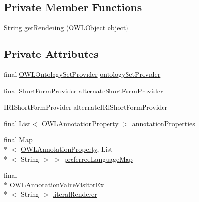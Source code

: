 \subsection*{Private Member Functions}
\begin{DoxyCompactItemize}
\item 
String \hyperlink{classorg_1_1semanticweb_1_1owlapi_1_1util_1_1_annotation_value_short_form_provider_a25ed18bddd30d661c369fbfbe7159e04}{get\-Rendering} (\hyperlink{interfaceorg_1_1semanticweb_1_1owlapi_1_1model_1_1_o_w_l_object}{O\-W\-L\-Object} object)
\end{DoxyCompactItemize}
\subsection*{Private Attributes}
\begin{DoxyCompactItemize}
\item 
final \hyperlink{interfaceorg_1_1semanticweb_1_1owlapi_1_1model_1_1_o_w_l_ontology_set_provider}{O\-W\-L\-Ontology\-Set\-Provider} \hyperlink{classorg_1_1semanticweb_1_1owlapi_1_1util_1_1_annotation_value_short_form_provider_a4d4ec7b3e951eefa476162fbc4c1f7f4}{ontology\-Set\-Provider}
\item 
final \hyperlink{interfaceorg_1_1semanticweb_1_1owlapi_1_1util_1_1_short_form_provider}{Short\-Form\-Provider} \hyperlink{classorg_1_1semanticweb_1_1owlapi_1_1util_1_1_annotation_value_short_form_provider_adfc96b928a8d326125db31e2773d37c6}{alternate\-Short\-Form\-Provider}
\item 
\hyperlink{interfaceorg_1_1semanticweb_1_1owlapi_1_1util_1_1_i_r_i_short_form_provider}{I\-R\-I\-Short\-Form\-Provider} \hyperlink{classorg_1_1semanticweb_1_1owlapi_1_1util_1_1_annotation_value_short_form_provider_a98ba0de563098b463b6c673d86e6c9c0}{alternate\-I\-R\-I\-Short\-Form\-Provider}
\item 
final List$<$ \hyperlink{interfaceorg_1_1semanticweb_1_1owlapi_1_1model_1_1_o_w_l_annotation_property}{O\-W\-L\-Annotation\-Property} $>$ \hyperlink{classorg_1_1semanticweb_1_1owlapi_1_1util_1_1_annotation_value_short_form_provider_ad30a82dd27b95782947883ca62f4df64}{annotation\-Properties}
\item 
final Map\\*
$<$ \hyperlink{interfaceorg_1_1semanticweb_1_1owlapi_1_1model_1_1_o_w_l_annotation_property}{O\-W\-L\-Annotation\-Property}, List\\*
$<$ String $>$ $>$ \hyperlink{classorg_1_1semanticweb_1_1owlapi_1_1util_1_1_annotation_value_short_form_provider_a83a9a4c80131f3f5044efb8ba4073e41}{preferred\-Language\-Map}
\item 
final \\*
O\-W\-L\-Annotation\-Value\-Visitor\-Ex\\*
$<$ String $>$ \hyperlink{classorg_1_1semanticweb_1_1owlapi_1_1util_1_1_annotation_value_short_form_provider_a7c75406c142c1fe58da8d3c90f7e8f55}{literal\-Renderer}
\end{DoxyCompactItemize}


